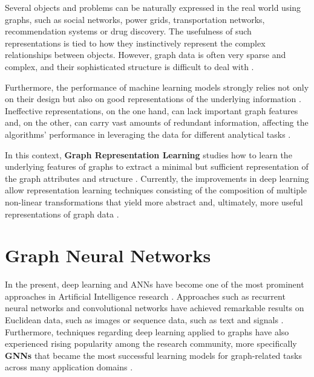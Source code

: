 Several objects and problems can be naturally expressed in the real world using graphs, such as social networks, power grids, transportation networks, recommendation systems or drug discovery. The usefulness of such representations is tied to how they instinctively represent the complex relationships between objects. However, graph data is often very sparse and complex, and their sophisticated structure is difficult to deal with \cite{liuIntroductionGraphNeural2020, zhaoRepresentationLearning2022}. \par

Furthermore, the performance of machine learning models strongly relies not only on their design but also on good representations of the underlying information \cite{liuIntroductionGraphNeural2020}.  Ineffective representations, on the one hand, can lack important graph features and, on the other, can carry vast amounts of redundant information, affecting the algorithms' performance in leveraging the data for different analytical tasks \cite{liuIntroductionGraphNeural2020, wuGraphNeuralNetworks2022}. \par

In this context, \textbf{Graph Representation Learning} studies how to learn the underlying features of graphs to extract a minimal but sufficient representation of the graph attributes and structure \cite{hamiltonGraphRepresentationLearning, zhaoRepresentationLearning2022, cuiGraphRepresentationLearning2022}. Currently, the improvements in deep learning allow representation learning techniques consisting of the composition of multiple non-linear transformations that yield more abstract and, ultimately, more useful representations of graph data \cite{cuiGraphRepresentationLearning2022}. 

\section{Graph Neural Networks} \label{sec:back-gnn}
 

In the present, deep learning and \acp{ANN} have become one of the most prominent approaches in Artificial Intelligence research \cite{cuiGraphRepresentationLearning2022}. Approaches such as recurrent neural networks and convolutional networks have achieved remarkable results on Euclidean data, such as images or sequence data, such as text and signals \cite{wuGraphNeuralNetworks2022a}. Furthermore, techniques regarding deep learning applied to graphs have also experienced rising popularity among the research community, more specifically \textbf{\acfp{GNN}} that became the most successful learning models for graph-related tasks across many application domains \cite{cuiGraphRepresentationLearning2022, wuGraphNeuralNetworks2022a}. \par

